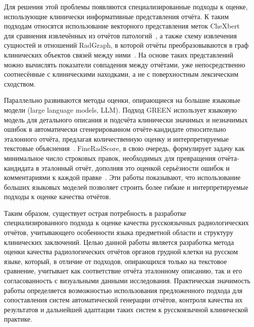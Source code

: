 Для решения этой проблемы появляются специализированные подходы к оценке, использующие клинически информативные представления отчёта. К таким подходам относятся использование векторного представления меток CheXbert для сравнения извлечённых из отчётов патологий~\cite{smit-etal-2020-combining,yu2023evaluating}, а также схему извлечения сущностей и отношений RadGraph, в которой отчёты преобразовываются в граф клинических объектов связей между ними~\cite{jain2021radgraph}. На основе таких представлений можно вычислять показатели совпадения между отчётами, уже непосредственно соотнесённые с клиническими находками, а не с поверхностным лексическим сходством.

Параллельно развиваются методы оценки, опирающиеся на большие языковые модели (large language models, LLM). Подход GREEN использует языковую модель для детального описания и подсчёта клинически значимых и незначимых ошибок в автоматически сгенерированном отчёте-кандидате относительно эталонного отчёта, предлагая количественную оценку и интерпретируемые текстовые объяснения~\cite{ostmeier2024green}. FineRadScore, в свою очередь, формулирует задачу как минимальное число строковых правок, необходимых для превращения отчёта-кандидата в эталонный отчёт, дополняя это оценкой серьёзности ошибок и комментариями к каждой правке~\cite{pmlr-v252-huang24a}. Эти работы показывают, что использование больших языковых моделей позволяет строить более гибкие и интерпретируемые подходы к оценке качества отчётов.

Таким образом, существует острая потребность в разработке специализированного подхода к оценке качества русскоязычных радиологических отчётов, учитывающего особенности языка предметной области и структуру клинических заключений. Целью данной работы является разработка метода оценки качества радиологических отчётов органов грудной клетки на русском языке, который, в отличие от подходов, опирающихся только на текстовое сравнение, учитывает как соответствие отчёта эталонному описанию, так и его согласованность с визуальными данными исследования. Практическая значимость работы определяется возможностью использования предложенного подхода для сопоставления систем автоматической генерации отчётов, контроля качества их результатов и дальнейшей адаптации таких систем к русскоязычной клинической практике.